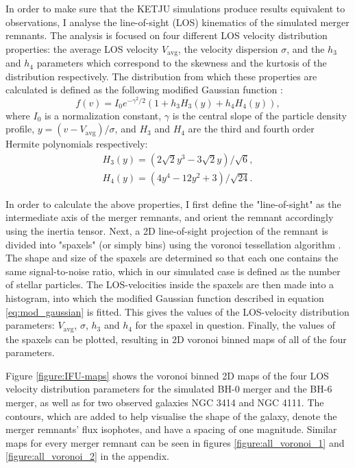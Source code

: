 \documentclass[english, oneside]{HYgradu}
\begin{document}
In order to make sure that the KETJU simulations produce results equivalent to observations, I analyse the line-of-sight (LOS) kinematics of the simulated merger remnants. The analysis is focused on four different LOS velocity distribution properties: the average LOS velocity $V_\mathrm{avg}$, the velocity dispersion $\sigma$, and the $h_3$ and $h_4$ parameters which correspond to the skewness and the kurtosis of the distribution respectively. The distribution from which these properties are calculated is defined as the following modified Gaussian function \citep{VanDerMarel1993, Bender1994}:
\begin{equation}
f(v) = I_0 e^{-\gamma^2/2}(1 + h_3 H_3(y) + h_4 H_4(y)), \label{eq:mod_gaussian}
\end{equation} 
where $I_0$ is a normalization constant, $\gamma$ is the central slope of the particle density profile, $y = (v - V_\mathrm{avg})/\sigma$, and $H_3$ and $H_4$ are the third and fourth order Hermite polynomials respectively:
\begin{eqnarray}
H_3(y) = \left(2\sqrt{2}y^3 - 3\sqrt{2}y\right) / \sqrt{6}, \\
H_4(y) = \left(4y^4 - 12y^2 + 3 \right) / \sqrt{24}.
\end{eqnarray}

In order to calculate the above properties, I first define the "line-of-sight" as the intermediate axis of the merger remnants, and orient the remnant accordingly using the inertia tensor. Next, a 2D line-of-sight projection of the remnant is divided into "spaxels" (or simply bins) using the voronoi tessellation algorithm \citep{Cappellari2003}. The shape and size of the spaxels are determined so that each one contains the same signal-to-noise ratio, which in our simulated case is defined as the number of stellar particles. The LOS-velocities inside the spaxels are then made into a histogram, into which the modified Gaussian function described in equation \ref{eq:mod_gaussian} is fitted. This gives the values of the LOS-velocity distribution parameters: $V_\mathrm{avg}$, $\sigma$, $h_3$ and $h_4$ for the spaxel in question. Finally, the values of the spaxels can be plotted, resulting in 2D voronoi binned maps of all of the four parameters.

Figure \ref{figure:IFU-maps} shows the voronoi binned 2D maps of the four LOS velocity distribution parameters for the simulated BH-0 merger and the BH-6 merger, as well as for two observed galaxies NGC 3414 and NGC 4111. The contours, which are added to help visualise the shape of the galaxy, denote the merger remnants' flux isophotes, and have a spacing of one magnitude. Similar maps for every merger remnant can be seen in figures \ref{figure:all_voronoi_1} and \ref{figure:all_voronoi_2} in the appendix.
\end{document}
